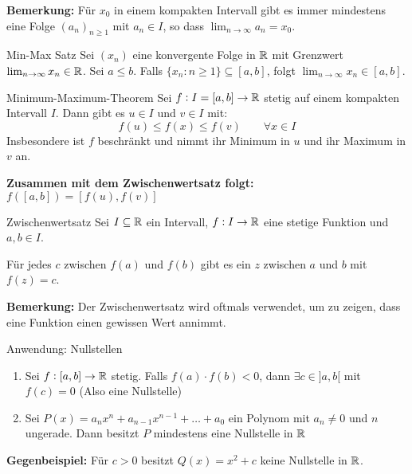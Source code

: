 \textbf{Bemerkung:} Für $x_0$ in einem kompakten Intervall gibt es immer mindestens eine Folge $(a_n)_{n\geq 1}$ mit $a_n \in I$, so dass $\lim_{n \to \infty} a_n = x_0$.

\begin{lemma}{Min-Max Satz}
    Sei $(x_n)$ eine konvergente Folge in $\mathbb{R}$ mit Grenzwert $\lim_{n \to \infty} x_n \in \mathbb{R}$. Sei $a \leq b$. Falls $\{x_n : n \geq 1\} \subseteq [a,b]$, folgt $\lim_{n \to \infty} x_n \in [a,b]$.
\end{lemma}

\begin{theorem}{Minimum-Maximum-Theorem}
    Sei $f:I= [a,b] \to \mathbb{R}$ stetig auf einem kompakten Intervall $I$. Dann gibt es $u \in I$ und $v \in I$ mit:
    \begin{equation*}
        f(u) \leq f(x) \leq f(v) \qquad \forall x \in I
    \end{equation*}
    Insbesondere ist $f$ beschränkt und nimmt ihr Minimum in $u$ und ihr Maximum in $v$ an.
\end{theorem}

\textbf{Zusammen mit dem Zwischenwertsatz folgt:} $f([a,b]) = [f(u), f(v)]$

\begin{lemma}{Zwischenwertsatz}
    Sei $I \subseteq \mathbb{R}$ ein Intervall, $f: I \to \mathbb{R}$ eine stetige Funktion und $a,b \in I$.

    Für jedes $c$ zwischen $f(a)$ und $f(b)$ gibt es ein $z$ zwischen $a$ und $b$ mit $f(z) = c$.
\end{lemma}

\textbf{Bemerkung:} Der Zwischenwertsatz wird oftmals verwendet, um zu zeigen, dass eine Funktion einen gewissen Wert annimmt.

\begin{KR}{Anwendung: Nullstellen}
    \begin{enumerate}
        \item Sei $f:[a,b] \to \mathbb{R}$ stetig. Falls $f(a) \cdot f(b) < 0$, dann $\exists c \in ]a,b[$ mit $f(c) = 0$ (Also eine Nullstelle)
        \item Sei $P(x) = a_n x^n + a_{n-1}x^{n-1} + \ldots + a_0$ ein Polynom mit $a_n \neq 0$ und $n$ ungerade. Dann besitzt $P$ mindestens eine Nullstelle in $\mathbb{R}$
    \end{enumerate}
\end{KR}

\textbf{Gegenbeispiel:} Für $c > 0$ besitzt $Q(x) = x^2 + c$ keine Nullstelle in $\mathbb{R}$.

